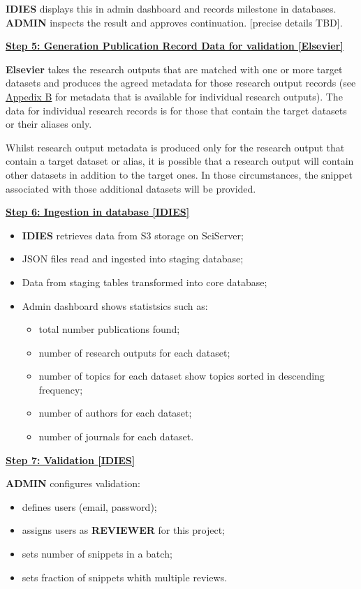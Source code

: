 \documentclass[titlepage, 11pt]{article}
\begin{document}
{\textbf{IDIES} displays this in admin dashboard and records milestone in databases.
\textbf{ADMIN} inspects the result and approves continuation. [precise details TBD].

\bigskip
\underline{\textbf{Step 5: Generation Publication Record Data for validation [Elsevier]}}

\textbf{Elsevier} takes the research outputs that are matched with one or more target datasets and produces the agreed metadata for those research output records (see \hyperref[sec:APPENDIXB]{Appedix B} for metadata that is available for individual research outputs). The data for individual research records is for those that contain the target datasets or their aliases only. 

Whilst research output metadata is produced only for the research output that contain a target dataset or alias, it is possible that a research output will contain other datasets in addition to the target ones. In those circumstances, the snippet associated with those additional datasets will be provided.

\bigskip
\underline{\textbf{Step 6: Ingestion in database [IDIES]}}
\begin{itemize}
    \item \textbf{IDIES} retrieves data from S3 storage on SciServer;
    \item JSON files read and ingested into staging database;
    \item Data from staging tables transformed into core database;
    \item Admin dashboard shows statistsics such as: \begin{itemize}
        \item total number publications found;
        \item number of research outputs for each dataset;
        \item number of topics for each dataset show topics sorted in descending frequency;
        \item number of authors for each dataset;
        \item number of journals for each dataset.
    \end{itemize}
\end{itemize}

\bigskip
\underline{\textbf{Step 7: Validation [IDIES]}}

\textbf{ADMIN} configures validation:
\begin{itemize}
    \item defines users (email, password);
    \item assigns users as \textbf{REVIEWER} for this project;
    \item sets number of snippets in a batch;
    \item sets fraction of snippets whith multiple reviews.
\end{itemize}

}
\end{document}
